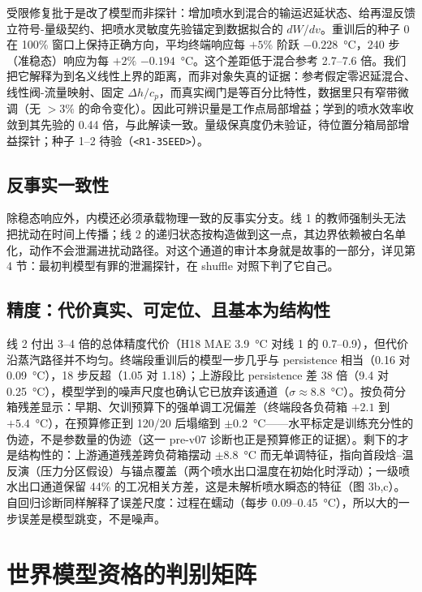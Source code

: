 \documentclass[11pt]{article}
\begin{document}
受限修复批于是改了模型而非探针：增加喷水到混合的输运迟延状态、给再湿反馈立符号-量级契约、把喷水灵敏度先验锚定到数据拟合的 $dW/dv$。重训后的种子 0 在 100\% 窗口上保持正确方向，平均终端响应每 $+5\%$ 阶跃 $-0.228$~\si{\degreeCelsius}，240 步（准稳态）响应为每 $+2\%$ $-0.194$~\si{\degreeCelsius}。这个差距低于混合参考 2.7--7.6 倍。我们把它解释为到名义线性上界的距离，而非对象失真的证据：参考假定零迟延混合、线性阀-流量映射、固定 $\Delta h/c_p$，而真实阀门是等百分比特性，数据里只有窄带微调（无 $>3\%$ 的命令变化）。因此可辨识量是工作点局部增益；学到的喷水效率收敛到其先验的 0.44 倍，与此解读一致。量级保真度仍未验证，待位置分箱局部增益探针；种子 1--2 待验（\texttt{\textless R1-3SEED\textgreater}）。

\subsection{反事实一致性}

除稳态响应外，内模还必须承载物理一致的反事实分支。线 1 的教师强制头无法把扰动在时间上传播；线 2 的递归状态按构造做到这一点，其边界依赖被白名单化，动作不会泄漏进扰动路径。对这个通道的审计本身就是故事的一部分，详见第 4 节：最初判模型有罪的泄漏探针，在 shuffle 对照下判了它自己。

\subsection{精度：代价真实、可定位、且基本为结构性}

线 2 付出 3--4 倍的总体精度代价（H18 MAE 3.9~\si{\degreeCelsius} 对线 1 的 0.7--0.9），但代价沿蒸汽路径并不均匀。终端段重训后的模型一步几乎与 persistence 相当（0.16 对 0.09~\si{\degreeCelsius}），18 步反超（1.05 对 1.18）；上游段比 persistence 差 38 倍（9.4 对 0.25~\si{\degreeCelsius}），模型学到的噪声尺度也确认它已放弃该通道（$\sigma \approx 8.8$~\si{\degreeCelsius}）。按负荷分箱残差显示：早期、欠训预算下的强单调工况偏差（终端段各负荷箱 $+2.1$ 到 $+5.4$~\si{\degreeCelsius}），在预算修正到 120/20 后塌缩到 $\pm$0.2~\si{\degreeCelsius}——水平标定是训练充分性的伪迹，不是参数量的伪迹（这一 pre-v07 诊断也正是预算修正的证据）。剩下的才是结构性的：上游通道残差跨负荷箱摆动 $\pm$8.8~\si{\degreeCelsius} 而无单调特征，指向首段焓--温反演（压力分区假设）与锚点覆盖（两个喷水出口温度在初始化时浮动）；一级喷水出口通道保留 44\% 的工况相关方差，这是未解析喷水瞬态的特征（图 3b,c）。自回归诊断同样解释了误差尺度：过程在蠕动（每步 0.09--0.45~\si{\degreeCelsius}），所以大的一步误差是模型跳变，不是噪声。

\section{世界模型资格的判别矩阵}
\end{document}
